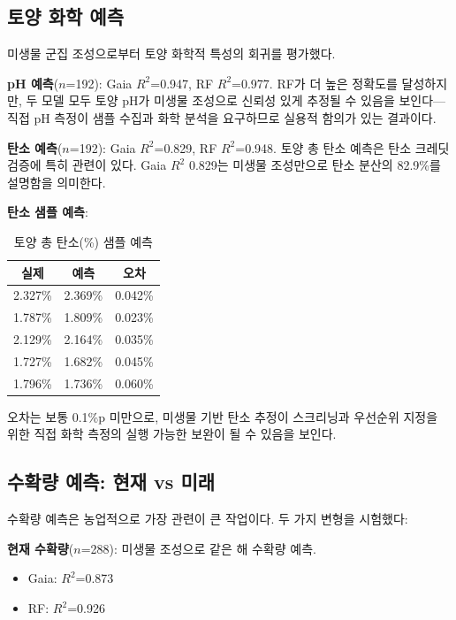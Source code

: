 \documentclass[11pt,a4paper]{article}
\begin{document}
\subsection{토양 화학 예측}

미생물 군집 조성으로부터 토양 화학적 특성의 회귀를 평가했다.

\textbf{pH 예측}($n$=192): Gaia $R^2$=0.947, RF $R^2$=0.977. RF가 더 높은 정확도를 달성하지만, 두 모델 모두 토양 pH가 미생물 조성으로 신뢰성 있게 추정될 수 있음을 보인다---직접 pH 측정이 샘플 수집과 화학 분석을 요구하므로 실용적 함의가 있는 결과이다.

\textbf{탄소 예측}($n$=192): Gaia $R^2$=0.829, RF $R^2$=0.948. 토양 총 탄소 예측은 탄소 크레딧 검증에 특히 관련이 있다. Gaia $R^2$ 0.829는 미생물 조성만으로 탄소 분산의 82.9\%를 설명함을 의미한다.

\textbf{탄소 샘플 예측}:

\begin{table}[H]
\centering
\caption{토양 총 탄소(\%) 샘플 예측}
\begin{tabular}{ccc}
\toprule
\textbf{실제} & \textbf{예측} & \textbf{오차} \\
\midrule
2.327\% & 2.369\% & 0.042\% \\
1.787\% & 1.809\% & 0.023\% \\
2.129\% & 2.164\% & 0.035\% \\
1.727\% & 1.682\% & 0.045\% \\
1.796\% & 1.736\% & 0.060\% \\
\bottomrule
\end{tabular}
\end{table}

오차는 보통 0.1\%p 미만으로, 미생물 기반 탄소 추정이 스크리닝과 우선순위 지정을 위한 직접 화학 측정의 실행 가능한 보완이 될 수 있음을 보인다.

\subsection{수확량 예측: 현재 vs 미래}

수확량 예측은 농업적으로 가장 관련이 큰 작업이다. 두 가지 변형을 시험했다:

\textbf{현재 수확량}($n$=288): 미생물 조성으로 같은 해 수확량 예측.
\begin{itemize}[leftmargin=1.5em]
    \item Gaia: $R^2$=0.873
    \item RF: $R^2$=0.926
\end{itemize}
\end{document}
